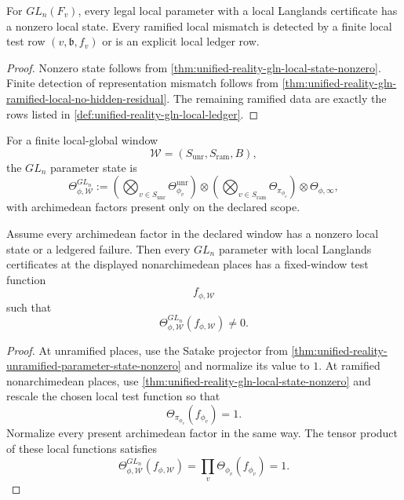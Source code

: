 \begin{corollary}
\label{cor:unified-reality-gln-ramified-local-state-closure}
For $GL_n(F_v)$, every legal local parameter with a local Langlands
certificate has a nonzero local state. Every ramified local mismatch is
detected by a finite local test row $(v,\mathfrak b,f_v)$ or is an
explicit local ledger row.
\end{corollary}
\begin{proof}
Nonzero state follows from
\autoref{thm:unified-reality-gln-local-state-nonzero}. Finite detection
of representation mismatch follows from
\autoref{thm:unified-reality-gln-ramified-local-no-hidden-residual}.
The remaining ramified data are exactly the rows listed in
\autoref{def:unified-reality-gln-local-ledger}.
\end{proof}

\begin{definition}
\label{def:unified-reality-gln-fixed-window-parameter-state}
For a finite local-global window
$$
\mathcal W=(S_{\mathrm{unr}},S_{\mathrm{ram}},B),
$$
the $GL_n$ parameter state is
$$
\Theta_{\phi,\mathcal W}^{GL_n}
:=
\left(\bigotimes_{v\in S_{\mathrm{unr}}}
\Theta_{\phi_v}^{\mathrm{unr}}\right)
\otimes
\left(\bigotimes_{v\in S_{\mathrm{ram}}}
\Theta_{\pi_{\phi_v}}\right)
\otimes
\Theta_{\phi,\infty},
$$
with archimedean factors present only on the declared scope.
\end{definition}

\begin{theorem}
\label{thm:unified-reality-gln-fixed-window-parameter-nonzero}
Assume every archimedean factor in the declared window has a nonzero
local state or a ledgered failure. Then every $GL_n$ parameter with
local Langlands certificates at the displayed nonarchimedean places has
a fixed-window test function
$$
f_{\phi,\mathcal W}
$$
such that
$$
\Theta_{\phi,\mathcal W}^{GL_n}(f_{\phi,\mathcal W})\ne0.
$$
\end{theorem}
\begin{proof}
At unramified places, use the Satake projector from
\autoref{thm:unified-reality-unramified-parameter-state-nonzero} and
normalize its value to $1$. At ramified nonarchimedean places, use
\autoref{thm:unified-reality-gln-local-state-nonzero} and rescale the
chosen local test function so that
$$
\Theta_{\pi_{\phi_v}}(f_{\phi_v})=1.
$$
Normalize every present archimedean factor in the same way. The tensor
product of these local functions satisfies
$$
\Theta_{\phi,\mathcal W}^{GL_n}(f_{\phi,\mathcal W})
=
\prod_v \Theta_{\phi_v}(f_{\phi_v})
=
1.
$$
\end{proof}

